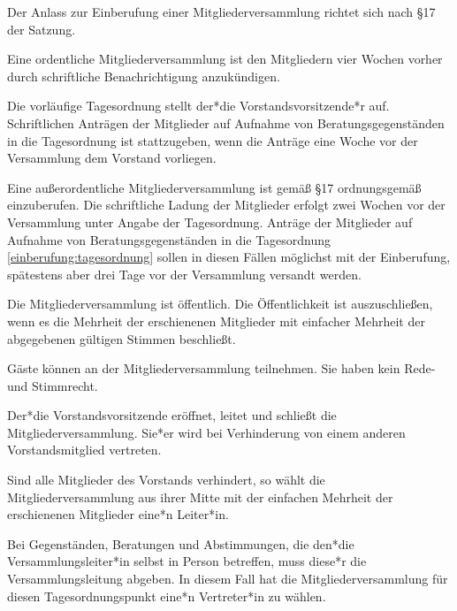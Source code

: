 \begin{gfmitglieder}


  Der Anlass zur Einberufung einer Mitgliederversammlung richtet sich nach \S 17 der Satzung.

  Eine ordentliche Mitgliederversammlung ist den Mitgliedern vier Wochen vorher durch schriftliche Benachrichtigung anzukündigen.

  Die vorläufige Tagesordnung stellt der*die Vorstandsvorsitzende*r auf. Schriftlichen Anträgen der Mitglieder auf Aufnahme von Beratungsgegenständen in die Tagesordnung ist stattzugeben, wenn die Anträge eine Woche vor der Versammlung dem Vorstand vorliegen.
  \label{einberufung:tagesordnung}

  Eine außerordentliche Mitgliederversammlung ist gemäß \S 17 ordnungsgemäß einzuberufen. Die schriftliche Ladung der Mitglieder erfolgt zwei Wochen vor der Versammlung unter Angabe der Tagesordnung. Anträge der Mitglieder auf Aufnahme von Beratungsgegenständen in die Tagesordnung \ref{einberufung:tagesordnung} sollen in diesen Fällen möglichst mit der Einberufung, spätestens aber drei Tage vor der Versammlung versandt werden.


  Die Mitgliederversammlung ist öffentlich. Die Öffentlichkeit ist auszuschließen, wenn es die Mehrheit der erschienenen Mitglieder mit einfacher Mehrheit der abgegebenen gültigen Stimmen beschließt.

  Gäste können an der Mitgliederversammlung teilnehmen. Sie haben kein Rede- und Stimmrecht.


  Der*die Vorstandsvorsitzende eröffnet, leitet und schließt die Mitgliederversammlung. Sie*er wird bei Verhinderung von einem anderen Vorstandsmitglied vertreten.

  Sind alle Mitglieder des Vorstands verhindert, so wählt die Mitgliederversammlung aus ihrer Mitte mit der einfachen Mehrheit der erschienenen Mitglieder eine*n Leiter*in.

  Bei Gegenständen, Beratungen und Abstimmungen, die den*die Versammlungsleiter*in selbst in Person betreffen, muss diese*r die Versammlungsleitung abgeben. In diesem Fall hat die Mitgliederversammlung für diesen Tagesordnungspunkt eine*n Vertreter*in zu wählen.



\end{gfmitglieder}
